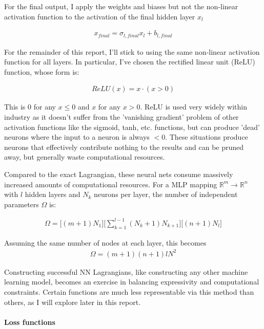 \documentclass[]{article}
\begin{document}
For the final output, I apply the weights and biases but not the non-linear activation function to the activation of the final hidden layer $x_l$

\begin{eqnarray*}
	x_{final}= \sigma_{l,final}  x_l + b_{l,final}
\end{eqnarray*}

For the remainder of this report, I'll stick to using the same non-linear activation function for all layers. In particular, I've chosen the rectified linear unit (ReLU) function, whose form is:

\begin{eqnarray*}
	ReLU(x) = x\cdot (x>0)
\end{eqnarray*}

This is 0 for any $x\leq0$ and $x$ for any $x>0$. ReLU is used very widely within industry as it doesn't suffer from the 'vanishing gradient' problem of other activation functions like the sigmoid, tanh, etc. functions, but can produce 'dead' neurons where the input to a neuron is always $<0$. These situations produce neurons that effectively contribute nothing to the results and can be pruned away, but generally waste computational resources. 

Compared to the exact Lagrangian, these neural nets consume massively increased amounts of computational resources. For a MLP mapping $\mathbb{R}^m  \to \mathbb{R}^n$ with $l$ hidden layers and $N_k$ neurons per layer, the number of independent parameters $\Omega$ is:

\begin{eqnarray*}
	\Omega = \Big[ (m+1)N_1 \Big] \Big[\sum_{k=1}^{l-1} (N_k+1)N_{k+1}\Big] \Big[(n+1)N_{l}\Big]
\end{eqnarray*}

Assuming the same number of nodes at each layer, this becomes
\begin{eqnarray*}
	\Omega = (m+1)(n+1)lN^{2}
\end{eqnarray*}

Constructing successful NN Lagrangians, like constructing any other machine learning model, becomes an exercise in balancing expressivity and computational constraints. Certain functions are much less representable via this method than others, as I will explore later in this report.


\paragraph{Loss functions}
\end{document}
